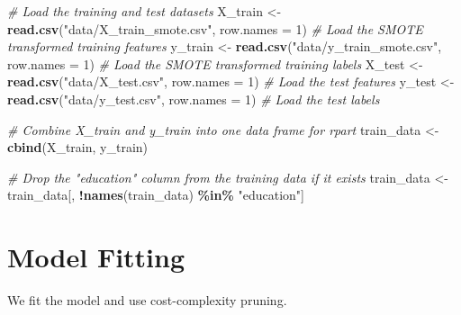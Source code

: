 \documentclass[
]{article}
\newenvironment{Shaded}{\begin{snugshade}}{\end{snugshade}}
\newcommand{\AttributeTok}[1]{\textcolor[rgb]{0.13,0.29,0.53}{#1}}
\newcommand{\CommentTok}[1]{\textcolor[rgb]{0.56,0.35,0.01}{\textit{#1}}}
\newcommand{\DecValTok}[1]{\textcolor[rgb]{0.00,0.00,0.81}{#1}}
\newcommand{\FloatTok}[1]{\textcolor[rgb]{0.00,0.00,0.81}{#1}}
\newcommand{\FunctionTok}[1]{\textcolor[rgb]{0.13,0.29,0.53}{\textbf{#1}}}
\newcommand{\NormalTok}[1]{#1}
\newcommand{\OtherTok}[1]{\textcolor[rgb]{0.56,0.35,0.01}{#1}}
\newcommand{\SpecialCharTok}[1]{\textcolor[rgb]{0.81,0.36,0.00}{\textbf{#1}}}
\newcommand{\StringTok}[1]{\textcolor[rgb]{0.31,0.60,0.02}{#1}}
\begin{document}
\begin{Shaded}
\begin{Highlighting}[]
\CommentTok{\# Load the training and test datasets}
\NormalTok{X\_train }\OtherTok{\textless{}{-}} \FunctionTok{read.csv}\NormalTok{(}\StringTok{"data/X\_train\_smote.csv"}\NormalTok{, }\AttributeTok{row.names =} \DecValTok{1}\NormalTok{)  }\CommentTok{\# Load the SMOTE transformed training features}
\NormalTok{y\_train }\OtherTok{\textless{}{-}} \FunctionTok{read.csv}\NormalTok{(}\StringTok{"data/y\_train\_smote.csv"}\NormalTok{, }\AttributeTok{row.names =} \DecValTok{1}\NormalTok{)  }\CommentTok{\# Load the SMOTE transformed training labels}
\NormalTok{X\_test }\OtherTok{\textless{}{-}} \FunctionTok{read.csv}\NormalTok{(}\StringTok{"data/X\_test.csv"}\NormalTok{, }\AttributeTok{row.names =} \DecValTok{1}\NormalTok{)    }\CommentTok{\# Load the test features}
\NormalTok{y\_test }\OtherTok{\textless{}{-}} \FunctionTok{read.csv}\NormalTok{(}\StringTok{"data/y\_test.csv"}\NormalTok{, }\AttributeTok{row.names =} \DecValTok{1}\NormalTok{)    }\CommentTok{\# Load the test labels}

\CommentTok{\# Combine X\_train and y\_train into one data frame for rpart}
\NormalTok{train\_data }\OtherTok{\textless{}{-}} \FunctionTok{cbind}\NormalTok{(X\_train, y\_train)}

\CommentTok{\# Drop the "education" column from the training data if it exists}
\NormalTok{train\_data }\OtherTok{\textless{}{-}}\NormalTok{ train\_data[, }\SpecialCharTok{!}\FunctionTok{names}\NormalTok{(train\_data) }\SpecialCharTok{\%in\%} \StringTok{"education"}\NormalTok{]}
\end{Highlighting}
\end{Shaded}

\section{Model Fitting}\label{model-fitting}

We fit the model and use cost-complexity pruning.

\begin{Shaded}
\end{Shaded}
\end{document}

